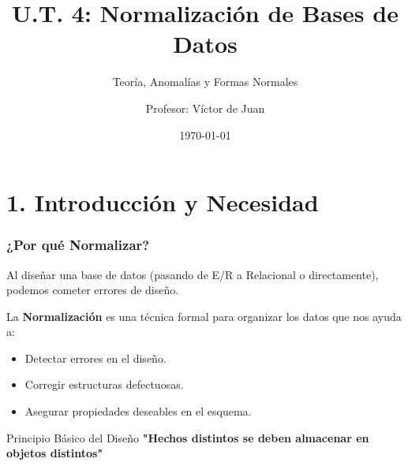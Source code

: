 \documentclass{beamer}
\title{U.T. 4: Normalización de Bases de Datos}
\subtitle{Teoría, Anomalías y Formas Normales}
\author{Profesor: Víctor de Juan}
\date{\today}
\begin{document}
\begin{frame}
  \titlepage
\end{frame}

\section{1. Introducción y Necesidad}

\begin{frame}
  \frametitle{¿Por qué Normalizar?}
  Al diseñar una base de datos (pasando de E/R a Relacional o directamente), podemos cometer errores de diseño.
  
  \vspace{1em}
  La \textbf{Normalización} es una técnica formal para organizar los datos que nos ayuda a:
  \begin{itemize}
      \item Detectar errores en el diseño.
      \item Corregir estructuras defectuosas.
      \item Asegurar propiedades deseables en el esquema.
  \end{itemize}

  \begin{block}{Principio Básico del Diseño}
    \centering
    \textbf{"Hechos distintos se deben almacenar en objetos distintos"}
  \end{block}
\end{frame}
\end{document}
